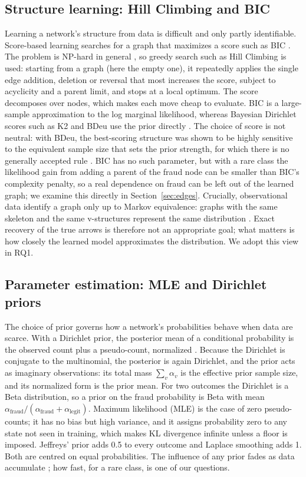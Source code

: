 \documentclass[final,5p,times,authoryear]{elsarticle}
\begin{document}
\subsection{Structure learning: Hill Climbing and BIC}
Learning a network's structure from data is difficult and only partly identifiable. Score-based learning searches for a graph that maximizes a score such as BIC \citep{schwarz1978,cooper1992,heckerman1995}. The problem is NP-hard in general \citep{chickering1996}, so greedy search such as Hill Climbing is used: starting from a graph (here the empty one), it repeatedly applies the single edge addition, deletion or reversal that most increases the score, subject to acyclicity and a parent limit, and stops at a local optimum. The score decomposes over nodes, which makes each move cheap to evaluate. BIC is a large-sample approximation to the log marginal likelihood, whereas Bayesian Dirichlet scores such as K2 and BDeu use the prior directly \citep{cooper1992,heckerman1995}. The choice of score is not neutral: with BDeu, the best-scoring structure was shown to be highly sensitive to the equivalent sample size that sets the prior strength, for which there is no generally accepted rule \citep{silander2007}. BIC has no such parameter, but with a rare class the likelihood gain from adding a parent of the fraud node can be smaller than BIC's complexity penalty, so a real dependence on fraud can be left out of the learned graph; we examine this directly in Section~\ref{sec:edges}. Crucially, observational data identify a graph only up to Markov equivalence: graphs with the same skeleton and the same v-structures represent the same distribution \citep{verma1990,spirtes2000,chickering2002}. Exact recovery of the true arrows is therefore not an appropriate goal; what matters is how closely the learned model approximates the distribution. We adopt this view in RQ1.

\subsection{Parameter estimation: MLE and Dirichlet priors}
The choice of prior governs how a network's probabilities behave when data are scarce. With a Dirichlet prior, the posterior mean of a conditional probability is the observed count plus a pseudo-count, normalized \citep{heckerman1995,gelman2013,koller2009}. Because the Dirichlet is conjugate to the multinomial, the posterior is again Dirichlet, and the prior acts as imaginary observations: its total mass $\sum_v\alpha_v$ is the effective prior sample size, and its normalized form is the prior mean. For two outcomes the Dirichlet is a Beta distribution, so a prior on the fraud probability is Beta with mean $\alpha_{\text{fraud}}/(\alpha_{\text{fraud}}+\alpha_{\text{legit}})$. Maximum likelihood (MLE) is the case of zero pseudo-counts; it has no bias but high variance, and it assigns probability zero to any state not seen in training, which makes KL divergence infinite unless a floor is imposed. Jeffreys' prior adds 0.5 to every outcome \citep{jeffreys1946} and Laplace smoothing adds 1. Both are centred on equal probabilities. The influence of any prior fades as data accumulate \citep{gelman2013}; how fast, for a rare class, is one of our questions.
\end{document}
